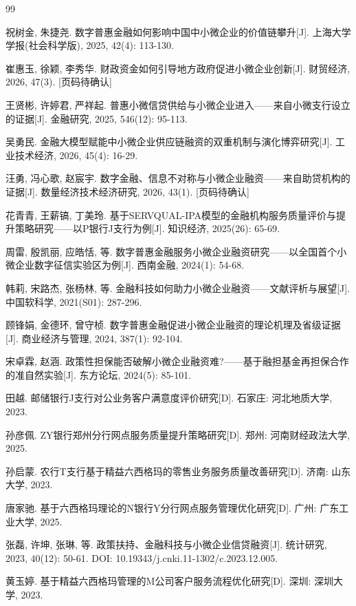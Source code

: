 \begin{thebibliography}{99}

 祝树金, 朱捷尧. 数字普惠金融如何影响中国中小微企业的价值链攀升[J]. 上海大学学报(社会科学版), 2025, 42(4): 113-130.

 崔惠玉, 徐颖, 李秀华. 财政资金如何引导地方政府促进小微企业创新[J]. 财贸经济, 2026, 47(3). [页码待确认]

 王贤彬, 许婷君, 严祥起. 普惠小微信贷供给与小微企业进入——来自小微支行设立的证据[J]. 金融研究, 2025, 546(12): 95-113.

 吴勇民. 金融大模型赋能中小微企业供应链融资的双重机制与演化博弈研究[J]. 工业技术经济, 2026, 45(4): 16-29.

 汪勇, 冯心歌, 赵宸宇. 数字金融、信息不对称与小微企业融资——来自助贷机构的证据[J]. 数量经济技术经济研究, 2026, 43(1). [页码待确认]

 花青青, 王薪镐, 丁美玲. 基于SERVQUAL-IPA模型的金融机构服务质量评价与提升策略研究——以P银行J支行为例[J]. 知识经济, 2025(26): 65-69.

 周雷, 殷凯丽, 应皓恬, 等. 数字普惠金融服务小微企业融资研究——以全国首个小微企业数字征信实验区为例[J]. 西南金融, 2024(1): 54-68.

 韩莉, 宋路杰, 张杨林, 等. 金融科技如何助力小微企业融资——文献评析与展望[J]. 中国软科学, 2021(S01): 287-296.

 顾锋娟, 金德环, 曾守桢. 数字普惠金融促进小微企业融资的理论机理及省级证据[J]. 商业经济与管理, 2024, 387(1): 92-104.

 宋卓霖, 赵涵. 政策性担保能否破解小微企业融资难?——基于融担基金再担保合作的准自然实验[J]. 东方论坛, 2024(5): 85-101.

 田越. 邮储银行J支行对公业务客户满意度评价研究[D]. 石家庄: 河北地质大学, 2023.

 孙彦佩. ZY银行郑州分行网点服务质量提升策略研究[D]. 郑州: 河南财经政法大学, 2025.

 孙启蒙. 农行T支行基于精益六西格玛的零售业务服务质量改善研究[D]. 济南: 山东大学, 2023.

 唐家驰. 基于六西格玛理论的N银行Y分行网点服务管理优化研究[D]. 广州: 广东工业大学, 2025.

 张磊, 许坤, 张琳, 等. 政策扶持、金融科技与小微企业信贷融资[J]. 统计研究, 2023, 40(12): 50-61. DOI: 10.19343/j.cnki.11-1302/c.2023.12.005.

 黄玉婷. 基于精益六西格玛管理的M公司客户服务流程优化研究[D]. 深圳: 深圳大学, 2023.


\end{thebibliography}
